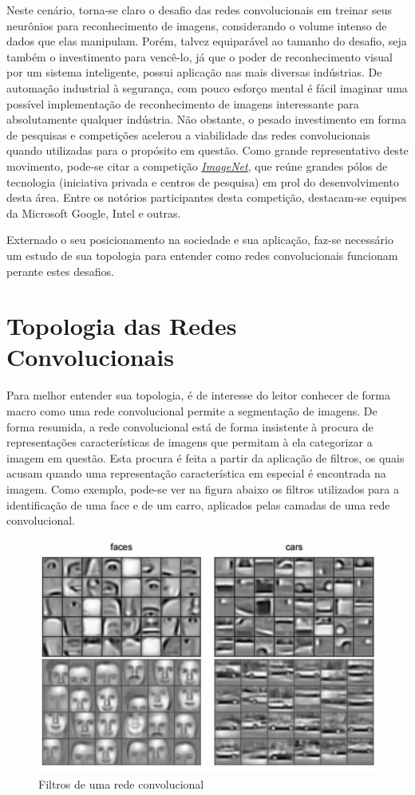 \documentclass[
	12pt,				%
	oneside,			%
	a4paper,			%
	english,			%
	french,				%
	spanish,			%
	brazil,				%
	]{abntex2}
\begin{document}
Neste cenário, torna-se claro o desafio das redes convolucionais em treinar seus neurônios para reconhecimento de imagens, considerando o volume intenso de dados que elas manipulam. Porém, talvez equiparável ao tamanho do desafio, seja também o investimento para vencê-lo, já que o poder de reconhecimento visual por um sistema inteligente, possui aplicação nas mais diversas indústrias. De automação industrial à segurança, com pouco esforço mental é fácil imaginar uma possível implementação de reconhecimento de imagens interessante para absolutamente qualquer indústria. Não obstante, o pesado investimento \cite{ref4} em forma de pesquisas e competições acelerou a viabilidade das redes convolucionais quando utilizadas para o propósito em questão. Como grande representativo deste movimento, pode-se citar a competição \href{http://www.image-net.org/challenges/LSVRC/}{\textit{ImageNet}}, que reúne grandes pólos de tecnologia (iniciativa privada e centros de pesquisa) em prol do desenvolvimento desta área. Entre os notórios participantes desta competição, destacam-se equipes da Microsoft Google, Intel e outras.

Externado o seu posicionamento na sociedade e sua aplicação, faz-se necessário um estudo de sua topologia para entender como redes convolucionais funcionam perante estes desafios.

\section{Topologia das Redes Convolucionais}
Para melhor entender sua topologia, é de interesse do leitor conhecer de forma macro como uma rede convolucional permite a segmentação de imagens. De forma resumida, a rede convolucional está de forma insistente à procura de representações características de imagens que permitam à ela categorizar a imagem em questão. Esta procura é feita a partir da aplicação de filtros, os quais acusam quando uma representação característica em especial é encontrada na imagem. Como exemplo, pode-se ver na figura abaixo os filtros utilizados para a identificação de uma face e de um carro, aplicados pelas camadas de uma rede convolucional.

\begin{figure}[H]
	\centering
	\includegraphics[width=.8\textwidth]{imagens/filtros}
	\caption{Filtros de uma rede convolucional}
	\label{filtros}
\end{figure} 
\end{document}
